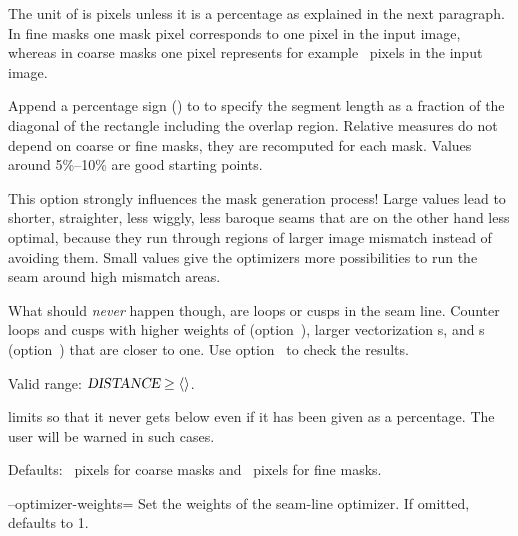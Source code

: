 \begin{codelist}
  The unit of  is pixels unless it is a percentage as explained in the next
  paragraph.  In fine masks one mask pixel corresponds to one pixel in the input image, whereas
  in coarse masks one pixel represents for example ~pixels in
  the input image.

  Append a percentage sign (\sample{\%}) to  to specify the segment length as
  a fraction of the diagonal of the rectangle including the overlap region.  Relative measures
  do not depend on coarse or fine masks, they are recomputed for each mask.  Values around
  5\%--10\% are good starting points.

  This option strongly influences the mask generation process!  Large  values
  lead to shorter, straighter, less wiggly, less baroque seams that are on the other hand less
  optimal, because they run through regions of larger image mismatch instead of avoiding them.
  Small  values give the optimizers more possibilities to run the seam around
  high mismatch areas.

  What should \emph{never} happen though, are loops or cusps in the seam line.  Counter loops
  and cusps with higher weights of 
  (option~), larger vectorization s, and
  s (option~) that are closer to one.  Use
  option~ to check the results.

  Valid range: $\metavar{DISTANCE} \geq \val{val:minimum-vectorize-distance}$.

  \App{} limits  so that it never gets below
   even if it has been given as a percentage.  The user will
  be warned in such cases.

  Defaults: ~pixels for coarse masks and
  ~pixels for fine masks.


  \label{opt:optimizer-weights}%
\item[--optimizer-weights=\metavar{DISTANCE-WEIGHT}\optional{:\metavar{MISMATCH-WEIGHT}}]\itemend
  Set the weights of the seam-line optimizer.  If omitted,  defaults to
  1.


\end{codelist}
